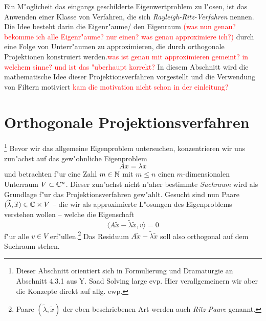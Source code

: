 Ein M"oglicheit das eingangs geschilderte Eigenwertproblem zu l"osen, ist
das Anwenden einer Klasse von Verfahren, die sich \emph{Rayleigh-Ritz-Verfahren}
nennen. Die Idee besteht darin die Eigenr"aume/ den Eigenraum \textcolor{red}{(was nun genau? bekomme ich alle
Eigenr"aume? nur einen? was genau approximiere ich?)} durch eine Folge von Unterr"aumen
zu approximieren, die durch orthogonale Projektionen konstruiert werden.\textcolor{red}{was ist genau
mit approximieren gemeint? in welchem sinne? und ist das "uberhaupt korrekt?} In diesem
Abschnitt wird die mathematische Idee dieser Projektionsverfahren vorgestellt und
die Verwendung von Filtern motiviert \textcolor{red}{kam die motivation nicht schon
in der einleitung?}

\section{Orthogonale Projektionsverfahren}
\footnote{Dieser Abschnitt orientiert sich in Formulierung und Dramaturgie an Abschnitt 4.3.1 aus Y. Saad Solving large evp. Hier verallgemeinern wir aber die Konzepte direkt auf allg. ewp.}
Bevor wir das allgemeine Eigenproblem untersuchen, konzentrieren wir uns zun"achst auf das gew"ohnliche Eigenproblem
\[
Ax = \lambda x%
\]
und betrachten f"ur eine Zahl $m\in\mathbb{N}$ mit $m\le n$
einen $m$-dimensionalen Unterraum $V\subset\mathbb{C}^n$. Dieser zun"achst nicht
n"aher bestimmte \emph{Suchraum} wird als Grundlage f"ur das Projektionsverfahren gew"ahlt.
Gesucht sind nun Paare $(\widetilde{\lambda}, \widetilde{x})\in\mathbb{C}\times V$ -- die wir als approximierte L"osungen des Eigenproblems verstehen wollen --
welche die Eigenschaft
\begin{equation}\label{eq:orthogonal}
\langle A\widetilde{x} - \widetilde{\lambda}\widetilde{x}, v\rangle=0
\end{equation}
f"ur alle $v\in V$ erf"ullen.\footnote{Paare $(\widetilde{\lambda}, \widetilde{x})$ der
eben beschriebenen Art werden auch \emph{Ritz-Paare} genannt.}
Das Residuum $A\widetilde{x} - \widetilde{\lambda}\widetilde{x}$
soll also orthogonal auf dem Suchraum stehen.\\%

